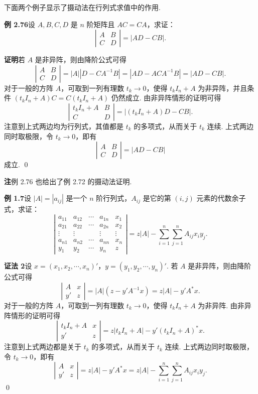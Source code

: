 \documentclass[UTF8,12pt,a4paper,fontset=fandol]{ctexart}
\begin{document}
下面两个例子显示了摄动法在行列式求值中的作用.

\noindent\textbf{例 2.76}\quad 设 $A,B,C,D$ 是 $n$ 阶矩阵且 $AC=CA$，求证：
\[
\left|
\begin{array}{cc}
A & B\\
C & D
\end{array}
\right|
=|AD-CB|.
\]

\noindent\textbf{证明}\quad 若 $A$ 是非异阵，则由降阶公式可得
\[
\left|
\begin{array}{cc}
A & B\\
C & D
\end{array}
\right|
=|A||D-CA^{-1}B|=|AD-ACA^{-1}B|=|AD-CB|.
\]
对于一般的方阵 $A$，可取到一列有理数 $t_k\to0$，使得 $t_kI_n+A$ 为非异阵，并且条件 $(t_kI_n+A)C=C(t_kI_n+A)$ 仍然成立. 由非异阵情形的证明可得
\[
\left|
\begin{array}{cc}
t_kI_n+A & B\\
C & D
\end{array}
\right|
=|(t_kI_n+A)D-CB|.
\]
注意到上式两边均为行列式，其值都是 $t_k$ 的多项式，从而关于 $t_k$ 连续. 上式两边同时取极限，令 $t_k\to0$，即有
\[
\left|
\begin{array}{cc}
A & B\\
C & D
\end{array}
\right|
=|AD-CB|
\]
成立. \qed

\noindent\textbf{注}\quad 例 2.76 也给出了例 2.72 的摄动法证明.

\noindent\textbf{例 1.7}\quad 设 $|A|=|a_{ij}|$ 是一个 $n$ 阶行列式，$A_{ij}$ 是它的第 $(i,j)$ 元素的代数余子式，求证：
\[
\left|
\begin{array}{ccccc}
a_{11} & a_{12} & \cdots & a_{1n} & x_1\\
a_{21} & a_{22} & \cdots & a_{2n} & x_2\\
\vdots & \vdots & & \vdots & \vdots\\
a_{n1} & a_{n2} & \cdots & a_{nn} & x_n\\
y_1 & y_2 & \cdots & y_n & z
\end{array}
\right|
=z|A|-\sum_{i=1}^n\sum_{j=1}^n A_{ij}x_iy_j.
\]

\noindent\textbf{证法 2}\quad 设 $x=(x_1,x_2,\cdots,x_n)'$，$y=(y_1,y_2,\cdots,y_n)'$. 若 $A$ 是非异阵，则由降阶公式可得
\[
\left|
\begin{array}{cc}
A & x\\
y' & z
\end{array}
\right|
=|A|(z-y'A^{-1}x)=z|A|-y'A^*x.
\]
对于一般的方阵 $A$，可取到一列有理数 $t_k\to0$，使得 $t_kI_n+A$ 为非异阵. 由非异阵情形的证明可得
\[
\left|
\begin{array}{cc}
t_kI_n+A & x\\
y' & z
\end{array}
\right|
=z|t_kI_n+A|-y'(t_kI_n+A)^*x.
\]
注意到上式两边都是关于 $t_k$ 的多项式，从而关于 $t_k$ 连续. 上式两边同时取极限，令 $t_k\to0$，即有
\[
\left|
\begin{array}{cc}
A & x\\
y' & z
\end{array}
\right|
=z|A|-y'A^*x
=z|A|-\sum_{i=1}^n\sum_{j=1}^n A_{ij}x_iy_j.
\]
\qed
\end{document}
